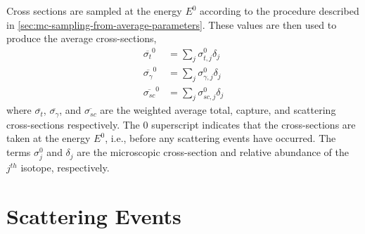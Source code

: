 Cross sections are sampled at the energy $E^0$ according to the procedure described in \autoref{sec:mc-sampling-from-average-parameters}. These values are then used to produce the average cross-sections,
\begin{align}
    \label{eq:average-total-cross-section}
    \overline{ \sigma_{t} }^{0} &= \sum_{j} \sigma_{t,j}^{0} \delta_{j} \\
    \label{eq:average-capture-cross-section}
    \overline{ \sigma_{\gamma} }^{0} &= \sum_{j} \sigma_{\gamma,j}^{0} \delta_{j} \\
    \label{eq:average-scattering-cross-section}
    \overline{ \sigma_{sc} }^{0} &= \sum_{j} \sigma_{sc,j}^{0} \delta_{j}
\end{align}
where $\overline{ \sigma_{t} }$, $\overline{ \sigma_{\gamma} }$, and $\overline{ \sigma_{sc} }$  are the weighted average total, capture, and scattering cross-sections respectively. The $0$ superscript indicates that the cross-sections are taken at the energy $E^{0}$, i.e., before any scattering events have occurred. The terms $\sigma_{j}^0$ and $\delta_{j}$ are the microscopic cross-section and relative abundance of the $j^{th}$ isotope, respectively.

\section{Scattering Events}

